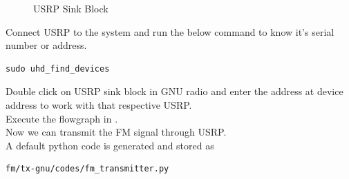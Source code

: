 \begin{enumerate}[label=\arabic*.,ref=\thesection.\theenumi]
\begin{figure}[H]
\caption{USRP Sink Block}
\label{fig:usrp sink block}
\end{figure}
Connect USRP to the system and run the below command to know it's serial number or address.\\
\begin{lstlisting}
sudo uhd_find_devices
\end{lstlisting}
Double click on USRP sink block in GNU radio and enter the address at device address to work with that respective USRP.\\ 
 Execute the flowgraph in .\\
Now we can transmit the FM signal through USRP.\\
A default python code is generated and stored as
\begin{lstlisting}
fm/tx-gnu/codes/fm_transmitter.py
\end{lstlisting}
\end{enumerate}
